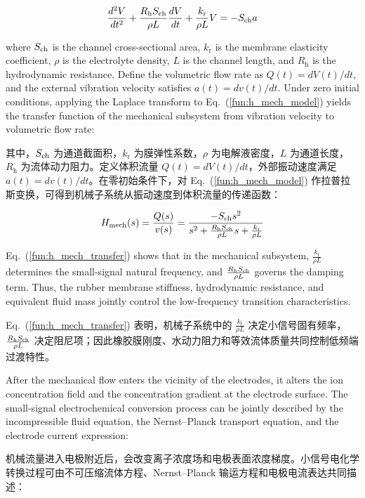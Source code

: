 \documentclass[sn-nature]{sn-jnl}
\newif\ifCNENEnglish
\newif\ifCNENBilingual
\newcommand{\CNEN}[2]{%
    \ifCNENBilingual
        #1%
        \if\relax\detokenize{#2}\relax\else\par #2\fi%
    \else
        \ifCNENEnglish
            #2%
        \else
            #1%
        \fi
    \fi
}
\newcommand{\kr}{k_{\text{r}}} %
\begin{document}
\begin{equation}
    \frac{d^2 V}{dt^2} + \frac{R_{\text{h}} S_{\rm ch}}{\rho L} \frac{dV}{dt} + \frac{\kr}{\rho L} V = -S_{\rm ch} a
    \label{fun:h_mech_model}
\end{equation}

\CNEN{其中，$S_{\rm ch}$ 为通道截面积，$\kr$ 为膜弹性系数，$\rho$ 为电解液密度，$L$ 为通道长度，$R_{\text{h}}$ 为流体动力阻力。定义体积流量 $Q(t)=dV(t)/dt$，外部振动速度满足 $a(t)=dv(t)/dt$。在零初始条件下，对 Eq.~(\ref{fun:h_mech_model}) 作拉普拉斯变换，可得到机械子系统从振动速度到体积流量的传递函数：}{where $S_{\rm ch}$ is the channel cross-sectional area, $\kr$ is the membrane elasticity coefficient, $\rho$ is the electrolyte density, $L$ is the channel length, and $R_{\text{h}}$ is the hydrodynamic resistance. Define the volumetric flow rate as $Q(t)=dV(t)/dt$, and the external vibration velocity satisfies $a(t)=dv(t)/dt$. Under zero initial conditions, applying the Laplace transform to Eq.~(\ref{fun:h_mech_model}) yields the transfer function of the mechanical subsystem from vibration velocity to volumetric flow rate:%
}

\begin{equation}
    H_{\rm mech}(s)  = \frac{Q(s)}{v(s)} = \frac{- S_{\rm ch} s^2}{s^2 + \frac{R_{\text{h}} S_{\rm ch}}{\rho L}s + \frac{\kr}{\rho L }}
    \label{fun:h_mech_transfer}
\end{equation}

\CNEN{Eq.~(\ref{fun:h_mech_transfer}) 表明，机械子系统中的 $\frac{\kr}{\rho L}$ 决定小信号固有频率，$\frac{R_{\text{h}} S_{\rm ch}}{\rho L}$ 决定阻尼项；因此橡胶膜刚度、水动力阻力和等效流体质量共同控制低频端过渡特性。}{Eq.~(\ref{fun:h_mech_transfer}) shows that in the mechanical subsystem, $\frac{\kr}{\rho L}$ determines the small-signal natural frequency, and $\frac{R_{\text{h}} S_{\rm ch}}{\rho L}$ governs the damping term. Thus, the rubber membrane stiffness, hydrodynamic resistance, and equivalent fluid mass jointly control the low-frequency transition characteristics.%
}

\CNEN{机械流量进入电极附近后，会改变离子浓度场和电极表面浓度梯度。小信号电化学转换过程可由不可压缩流体方程、Nernst--Planck 输运方程和电极电流表达共同描述：}{After the mechanical flow enters the vicinity of the electrodes, it alters the ion concentration field and the concentration gradient at the electrode surface. The small-signal electrochemical conversion process can be jointly described by the incompressible fluid equation, the Nernst--Planck transport equation, and the electrode current expression:%
}
\end{document}
